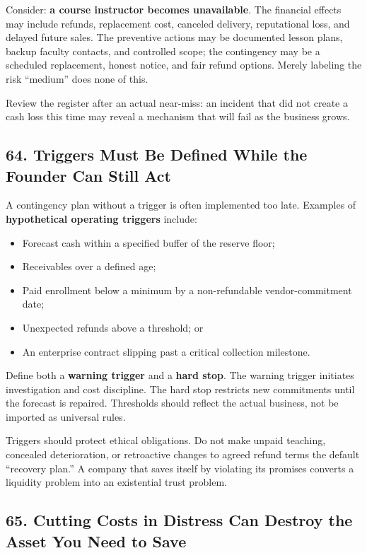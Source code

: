 Consider: \textbf{a course instructor becomes unavailable}. The financial effects may include refunds, replacement cost, canceled delivery, reputational loss, and delayed future sales. The preventive actions may be documented lesson plans, backup faculty contacts, and controlled scope; the contingency may be a scheduled replacement, honest notice, and fair refund options. Merely labeling the risk ``medium'' does none of this.

Review the register after an actual near-miss: an incident that did not create a cash loss this time may reveal a mechanism that will fail as the business grows.

\subsection*{64. Triggers Must Be Defined While the Founder Can Still Act}

A contingency plan without a trigger is often implemented too late. Examples of \textbf{hypothetical operating triggers} include:
\begin{itemize}
\item Forecast cash within a specified buffer of the reserve floor;
\item Receivables over a defined age;
\item Paid enrollment below a minimum by a non-refundable vendor-commitment date;
\item Unexpected refunds above a threshold; or
\item An enterprise contract slipping past a critical collection milestone.
\end{itemize}

Define both a \textbf{warning trigger} and a \textbf{hard stop}. The warning trigger initiates investigation and cost discipline. The hard stop restricts new commitments until the forecast is repaired. Thresholds should reflect the actual business, not be imported as universal rules.

Triggers should protect ethical obligations. Do not make unpaid teaching, concealed deterioration, or retroactive changes to agreed refund terms the default ``recovery plan.'' A company that saves itself by violating its promises converts a liquidity problem into an existential trust problem.

\subsection*{65. Cutting Costs in Distress Can Destroy the Asset You Need to Save}

